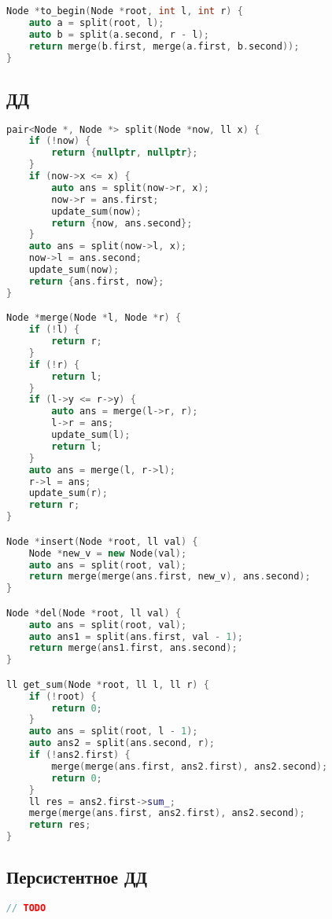 \documentclass[10pt,a4paper,landscape,twosided]{extarticle}
\begin{document}
\begin{multicols}{3}
\begin{lstlisting}[language=C++]
Node *to_begin(Node *root, int l, int r) {
    auto a = split(root, l);
    auto b = split(a.second, r - l);
    return merge(b.first, merge(a.first, b.second));
}

\end{lstlisting}

\subsection{ДД}
\begin{lstlisting}[language=C++]
pair<Node *, Node *> split(Node *now, ll x) {
    if (!now) {
        return {nullptr, nullptr};
    }
    if (now->x <= x) {
        auto ans = split(now->r, x);
        now->r = ans.first;
        update_sum(now);
        return {now, ans.second};
    }
    auto ans = split(now->l, x);
    now->l = ans.second;
    update_sum(now);
    return {ans.first, now};
}

Node *merge(Node *l, Node *r) {
    if (!l) {
        return r;
    }
    if (!r) {
        return l;
    }
    if (l->y <= r->y) {
        auto ans = merge(l->r, r);
        l->r = ans;
        update_sum(l);
        return l;
    }
    auto ans = merge(l, r->l);
    r->l = ans;
    update_sum(r);
    return r;
}

Node *insert(Node *root, ll val) {
    Node *new_v = new Node(val);
    auto ans = split(root, val);
    return merge(merge(ans.first, new_v), ans.second);
}

Node *del(Node *root, ll val) {
    auto ans = split(root, val);
    auto ans1 = split(ans.first, val - 1);
    return merge(ans1.first, ans.second);
}

ll get_sum(Node *root, ll l, ll r) {
    if (!root) {
        return 0;
    }
    auto ans = split(root, l - 1);
    auto ans2 = split(ans.second, r);
    if (!ans2.first) {
        merge(merge(ans.first, ans2.first), ans2.second);
        return 0;
    }
    ll res = ans2.first->sum_;
    merge(merge(ans.first, ans2.first), ans2.second);
    return res;
}

\end{lstlisting}

\subsection{Персистентное ДД}
\begin{lstlisting}[language=C++]
// TODO

\end{lstlisting}


\end{multicols}
\end{document}
